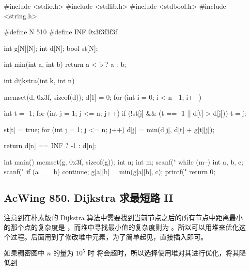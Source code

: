 \begin{mycpptwocol}[朴素 Dijkstra 算法]
    #include <stdio.h>
    #include <stdlib.h>
    #include <stdbool.h>
    #include <string.h>

    #define N 510
    #define INF 0x3f3f3f3f

    int g[N][N];
    int d[N];
    bool st[N];

    int min(int a, int b) {
        return a < b ? a : b;
    }

    int dijkstra(int k, int n) {
        memset(d, 0x3f, sizeof(d));
        d[1] = 0;
        for (int i = 0; i < n - 1; i++) {
            int t = -1;
            for (int j = 1; j <= n; j++) {
                if (!st[j] && (t == -1 || d[t] > d[j])) {
                    t = j;
                }
            }

            st[t] = true;
            for (int j = 1; j <= n; j++) {
                d[j] = min(d[j], d[t] + g[t][j]);
            }
        }

        return d[n] == INF ? -1 : d[n];
    }

    int main() {
        memset(g, 0x3f, sizeof(g));
        int n;
        int m;
        scanf("%
        while (m--) {
            int a, b, c;
            scanf("%
            if (a == b) {
                continue;
            }
            g[a][b] = min(g[a][b], c);
        }
        printf("%
        return 0;
    }
\end{mycpptwocol}

\subsection{AcWing 850. Dijkstra 求最短路 II}

注意到在朴素版的 Dijkstra 算法中需要找到当前节点之后的所有节点中距离最小的那个点的复杂度是 ，而堆中寻找最小值的复杂度则为 。所以可以用堆来优化这个过程。后面用到了修改堆中元素，为了简单起见，直接插入即可。

如果稠密图中 $n$ 的量为 $10^5$ 时  将会超时，所以选择使用堆对其进行优化，将其降低到 

